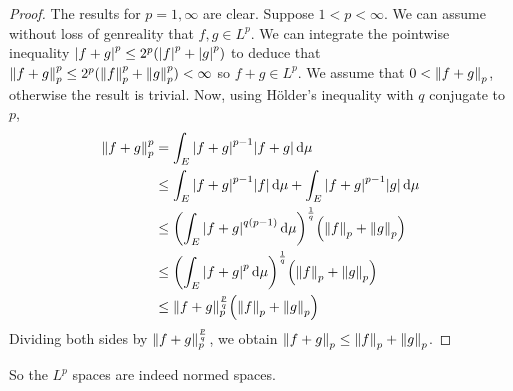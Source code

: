 \begin{proof}
	The results for \( p = 1, \infty \) are clear.
	Suppose \( 1 < p < \infty \).
	We can assume without loss of genreality that \( f, g \in L^p \).
	We can integrate the pointwise inequality \( \abs{f + g}^p \leq 2^p (\abs{f}^p + \abs{g}^p) \) to deduce that \( \norm{f + g}_p^p \leq 2^p (\norm{f}_p^p + \norm{g}_p^p) < \infty \) so \( f + g \in L^p \).
	We assume that \( 0 < \norm{f+g}_p \), otherwise the result is trivial.
	Now, using H\"older's inequality with \( q \) conjugate to \( p \),
	\begin{align*}
		\norm{f + g}_p^p &= \int_E \abs{f + g}^{p-1} \abs{f + g} \dd{\mu} \\
		&\leq \int_E \abs{f + g}^{p-1} \abs{f} \dd{\mu} + \int_E \abs{f + g}^{p-1} \abs{g} \dd{\mu} \\
		&\leq \qty(\int_E \abs{f + g}^{q(p-1)} \dd{\mu})^{\frac{1}{q}} \qty(\norm{f}_p + \norm{g}_p) \\
		&\leq \qty(\int_E \abs{f + g}^p \dd{\mu})^{\frac{1}{q}} \qty(\norm{f}_p + \norm{g}_p) \\
		&\leq \norm{f+g}_p^{\frac{p}{q}} \qty(\norm{f}_p + \norm{g}_p)
	\end{align*}
	Dividing both sides by \( \norm{f+g}_p^{\frac{p}{q}} \), we obtain \( \norm{f+g}_p \leq \norm{f}_p + \norm{g}_p \).
\end{proof}
So the \( L^p \) spaces are indeed normed spaces.

